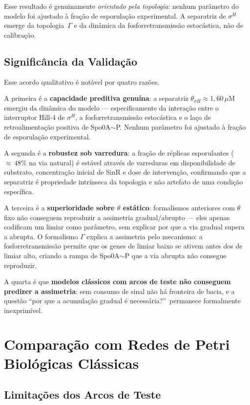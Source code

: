 Esse resultado é genuinamente \emph{orientado pela topologia}: nenhum parâmetro do modelo
foi ajustado à fração de esporulação experimental.
A separatriz de $\sigma^H$ emerge da topologia~$\Gamma$ e da dinâmica
da fosforretransmissão estocástica, não de calibração.

\subsection{Significância da Validação}

Esse acordo qualitativo é notável por quatro razões.

A primeira é a \textbf{capacidade preditiva genuína}: a separatriz
$\theta_{\sigma H} \approx 1{,}60\,\mu$M emergiu da dinâmica do modelo
--- especificamente da interação entre o interruptor Hill-4 de $\sigma^H$,
a fosforretransmissão estocástica e o laço de retroalimentação
positiva de Spo0A${\sim}$P.
Nenhum parâmetro foi ajustado à fração de esporulação experimental.

A segunda é a \textbf{robustez sob varredura}: a fração de réplicas
esporulantes (${\approx}\,48\%$ na via natural) é estável através de varreduras em
disponibilidade de substrato, concentração inicial de SinR e dose
de intervenção, confirmando que a separatriz é propriedade intrínseca
da topologia e não artefato de uma condição específica.

A terceira é a \textbf{superioridade sobre $\theta$ estático}: formalismos
anteriores com $\theta$ fixo não conseguem reproduzir a assimetria
gradual/abrupto --- eles apenas codificam um limiar como parâmetro, sem
explicar por que a via gradual supera a abrupta.
O formalismo $\Gamma$ explica a assimetria pelo mecanismo: a fosforretransmissão
permite que os genes de limiar baixo se ativem antes dos de limiar alto,
criando a rampa de Spo0A${\sim}$P que a via abrupta não consegue reproduzir.

A quarta é que \textbf{modelos clássicos com arcos de teste não conseguem
predizer a assimetria}: sem consumo de sinal não há fronteira de bacia,
e a questão ``por que a acumulação gradual é necessária?''\ permanece
formalmente inexprimível.

\section{Comparação com Redes de Petri Biológicas Clássicas}
\label{sec:comparacao-classicas}

\subsection{Limitações dos Arcos de Teste}

